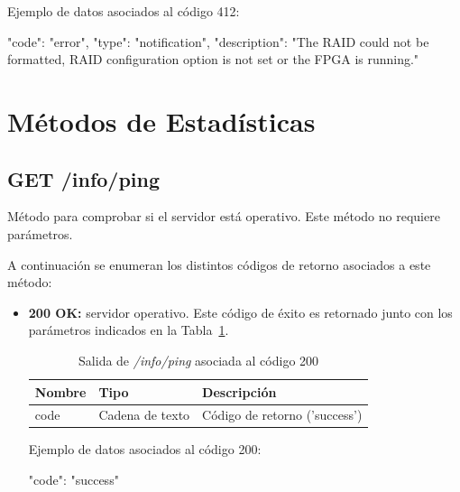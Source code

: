 \begin{itemize}
{\begin{minipage}{\textwidth}
Ejemplo de datos asociados al código 412:

\begin{code}[language=json]
{
  "code": "error",
  "type": "notification",
  "description": "The RAID could not be formatted, RAID configuration option is not set or the FPGA is running."
}
\end{code}
\end{minipage}
}

\end{itemize}



\section{Métodos de Estadísticas \label{extra:api:estadisticas}}

%
%
\subsection{GET /info/ping}
Método para comprobar si el servidor está operativo.
Este método no requiere parámetros.

A continuación se enumeran los distintos códigos de retorno asociados a este método:
\begin{itemize}

\item{\textbf{200 OK:} servidor operativo.
Este código de éxito es retornado junto con los parámetros indicados en la Tabla~\ref{extra:api:infoping:ok}.
\begin{table}[H]
\centering
\begin{tabular}{|l|l|l|}
\hline
\rowcolor[HTML]{F5F5F5}
\textbf{Nombre}  & \textbf{Tipo}   & \textbf{Descripción}              \\ \hline
code             & Cadena de texto & Código de retorno ('success')     \\ \hline
\end{tabular}
\caption{Salida de \textit{/info/ping} asociada al código 200}
\label{extra:api:infoping:ok}
\end{table}
\begin{minipage}{\textwidth}
Ejemplo de datos asociados al código 200:

\begin{code}[language=json]
{
  "code": "success"
}
\end{code}
\end{minipage}
}

\end{itemize}

